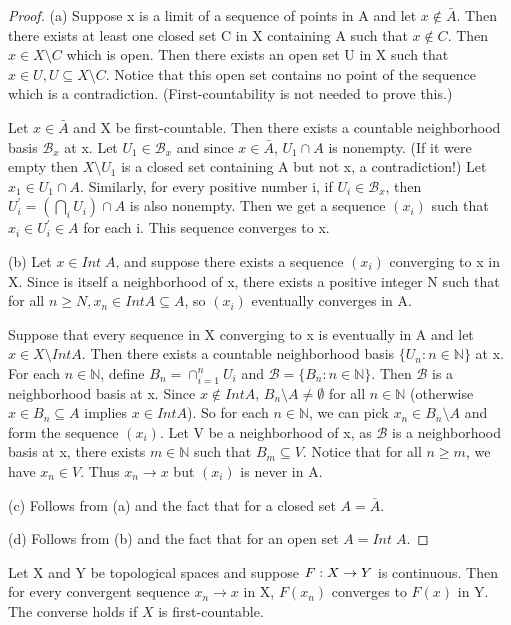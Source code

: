 \documentclass[11pt,a4paper]{article}
\begin{document}
\begin{proof}
    (a) Suppose x is a limit of a sequence of points in A and let $x\notin \bar{A}$. Then there exists at least one closed set C in X containing A such that $x\notin C$. Then $x\in X\setminus C$ which is open. Then there exists an open set U in X such that $x\in U, U\subseteq X\setminus C$. Notice that this open set contains no point of the sequence which is a contradiction. {(First-countability is not needed to prove this.)}

    Let $x\in \bar{A}$ and X be first-countable. Then there exists a countable neighborhood basis $\mathcal{B}_x$ at x. Let $U_1\in \mathcal{B}_x$ and since $x\in \bar{A}$, $U_1\cap A$ is nonempty. (If it were empty then $X\setminus U_1$ is a closed set containing A but not x,  a contradiction!) Let $x_1\in U_1\cap A$. Similarly, for every positive number i, if $U_i\in \mathcal{B}_x$, then $U_i^\prime = (\bigcap_i U_i)\cap A$ is also nonempty. Then we get a sequence $(x_i)$ such that $x_i\in U_i^\prime\in A$ for each i. This sequence converges to x.
    
    \noindent(b) Let $x\in Int\;A$, and suppose there exists a sequence $(x_i)$ converging to x in X. Since  is itself a neighborhood of x, there exists a positive integer N such that for all $n\ge N, x_n\in Int A\subseteq A$, so $(x_i)$ eventually converges in A.

    Suppose that every sequence in X converging to x is eventually in A and let $x\in X\setminus Int A$. Then there exists a countable neighborhood basis $\{U_n : n\in\mathbb{N}\}$ at x. For each $n\in\mathbb{N}$, define $B_n = \cap_{i=1}^n U_i$ and $\mathcal{B}=\{B_n : n\in\mathbb{N}\}$. Then $\mathcal{B}$ is a neighborhood basis at x. Since $x\notin Int A$, $B_n\setminus A \neq \emptyset$ for all $n\in \mathbb{N}$ (otherwise  $x\in B_n\subseteq A$ implies $x\in Int A$). So for each $n\in \mathbb{N}$, we can pick $x_n\in B_n\setminus A$ and form the sequence $(x_i)$. Let V be a neighborhood of x, as $\mathcal{B}$ is a neighborhood basis at x, there exists $m\in \mathbb{N}$ such that $B_m\subseteq V$. Notice that for all $n\ge m$, we have $x_n\in V$. Thus $x_n\rightarrow x$ but $(x_i)$ is never in A. 

    \noindent(c) Follows from (a) and the fact that for a closed set $A=\bar{A}$.

    \noindent(d) Follows from (b) and the fact that for an open set $A=Int\;A$.
\end{proof}

\begin{proposition}
    Let X and Y be topological spaces and suppose $F:X\rightarrow Y$ is continuous. Then for every convergent sequence $x_n\rightarrow x$ in X, $F(x_n)$ converges to $F(x)$ in Y. The converse holds if $X$ is first-countable.
\end{proposition}
\end{document}
